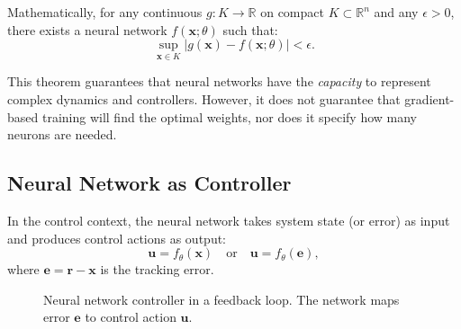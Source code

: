 Mathematically, for any continuous $g: K \to \mathbb{R}$ on compact $K \subset \mathbb{R}^n$ and any $\epsilon > 0$, there exists a neural network $f(\mathbf{x}; \theta)$ such that:
\begin{equation}
\sup_{\mathbf{x} \in K} |g(\mathbf{x}) - f(\mathbf{x}; \theta)| < \epsilon.
\end{equation}

This theorem guarantees that neural networks have the \textit{capacity} to represent complex dynamics and controllers. However, it does not guarantee that gradient-based training will find the optimal weights, nor does it specify how many neurons are needed.

\subsection{Neural Network as Controller}

In the control context, the neural network takes system state (or error) as input and produces control actions as output:
\begin{equation}
\mathbf{u} = f_{\theta}(\mathbf{x}) \quad \text{or} \quad \mathbf{u} = f_{\theta}(\mathbf{e}),
\label{eq:nn_controller}
\end{equation}
where $\mathbf{e} = \mathbf{r} - \mathbf{x}$ is the tracking error.

\begin{figure}[htbp]
\centering
{}
\caption{Neural network controller in a feedback loop. The network maps error $\mathbf{e}$ to control action $\mathbf{u}$.}
\label{fig:nn_control_loop}
\end{figure}

